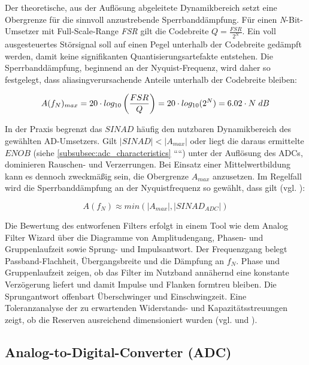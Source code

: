 \documentclass[a4paper, portrait, 12pt]{scrartcl} %
\begin{document}
Der theoretische, aus der Auflösung abgeleitete Dynamikbereich setzt eine Obergrenze für die sinnvoll anzustrebende Sperrbanddämpfung. Für einen \emph{N}-Bit-Umsetzer mit Full-Scale-Range \emph{FSR} gilt die Codebreite $Q = \frac{FSR}{2^N}$. Ein voll ausgesteuertes Störsignal soll auf einen Pegel unterhalb der Codebreite gedämpft werden, damit keine signifikanten Quantisierungsartefakte entstehen. Die Sperrbanddämpfung, beginnend an der Nyquist-Frequenz, wird daher so festgelegt, dass aliasingverursachende Anteile unterhalb der Codebreite bleiben:

\begin{equation}
	A(f_N)_{max}=20\cdot log_{10}\left( \frac{FSR}{Q}\right) =20\cdot log_{10}(2^N)=6.02\cdot N\hspace{0.1cm}dB
\end{equation}

In der Praxis begrenzt das $SINAD$ häufig den nutzbaren Dynamikbereich des gewählten AD-Umsetzers. Gilt $|SINAD|<|A_{max}|$ oder liegt die daraus ermittelte $ENOB$ (siehe \autoref{subsubsec:adc_characteristics} ````) unter der Auflösung des ADCs, dominieren Rauschen- und Verzerrungen. Bei Einsatz einer Mittelwertbildung kann es dennoch zweckmäßig sein, die Obergrenze $A_{max}$ anzusetzen. Im Regelfall wird die Sperrbanddämpfung an der Nyquistfrequenz so gewählt, dass gilt (vgl. \cite{Pini2020}):

\begin{equation}
	A(f_N)\approx min(|A_{max}|, |SINAD_{ADC}|)
\end{equation}

Die Bewertung des entworfenen Filters erfolgt in einem Tool wie dem Analog Filter Wizard über die Diagramme von Amplitudengang, Phasen- und Gruppenlaufzeit sowie Sprung- und Impulsantwort. Der Frequenzgang belegt Passband-Flachheit, Übergangsbreite und die Dämpfung an $f_N$. Phase und Gruppenlaufzeit zeigen, ob das Filter im Nutzband annähernd eine konstante Verzögerung liefert und damit Impulse und Flanken formtreu bleiben. Die Sprungantwort offenbart Überschwinger und Einschwingzeit. Eine Toleranzanalyse der zu erwartenden Widerstands- und Kapazitätsstreuungen zeigt, ob die Reserven ausreichend dimensioniert wurden (vgl. \cite{Pini2020} und \cite{Padmanabhuni2017}).

\subsection{Analog-to-Digital-Converter (ADC)}
\label{subsec:adc}
\end{document}
